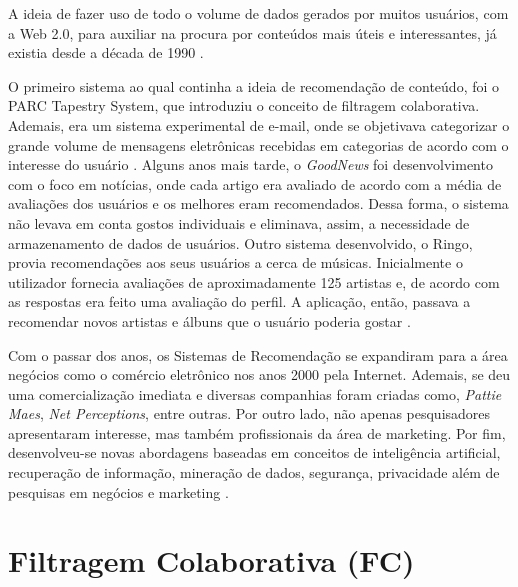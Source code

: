 A ideia de fazer uso de todo o volume de dados gerados por muitos usuários, com a Web 2.0, para auxiliar na procura por conteúdos mais úteis e interessantes, já existia desde a década de 1990 \cite{Jannach2010}.

O primeiro sistema ao qual continha a ideia de recomendação de conteúdo, foi o PARC Tapestry System, que introduziu o conceito de filtragem colaborativa. Ademais, era um sistema experimental de e-mail, onde se objetivava categorizar o grande volume de mensagens eletrônicas recebidas em categorias de acordo com o interesse do usuário \cite{Goldberg1992}.
Alguns anos mais tarde, o \textit{GoodNews} foi desenvolvimento com o foco em notícias, onde cada artigo era avaliado de acordo com a média de avaliações dos usuários e os melhores eram recomendados. Dessa forma, o sistema não levava em conta gostos individuais e eliminava, assim, a necessidade de armazenamento de dados de usuários.
Outro sistema desenvolvido, o Ringo, provia recomendações aos seus usuários a cerca de músicas. Inicialmente o utilizador fornecia avaliações  de aproximadamente 125 artistas e, de acordo com as respostas era feito uma avaliação do perfil.  A aplicação, então, passava a recomendar novos artistas e álbuns que o usuário poderia gostar \cite{Resnick1994}.

Com o passar dos anos, os Sistemas de Recomendação se expandiram para a área negócios como o comércio eletrônico nos anos 2000 pela Internet. Ademais, se deu uma comercialização imediata e diversas companhias foram criadas como, \textit{Pattie Maes}, \textit{Net Perceptions}, entre outras. Por outro lado, não apenas pesquisadores apresentaram interesse, mas também profissionais da área de marketing. Por fim, desenvolveu-se novas abordagens baseadas em conceitos de inteligência artificial, recuperação de informação, mineração de dados, segurança, privacidade além de pesquisas em negócios e marketing \cite{Jannach2010}.



\section{Filtragem Colaborativa (FC)} \label{sec:filtragem-colaborativa}
    
